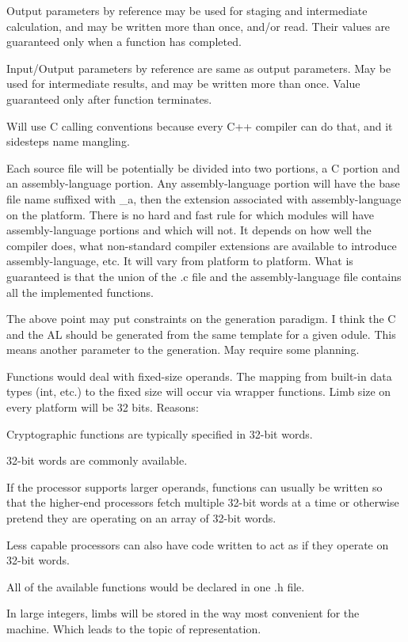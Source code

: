 Output parameters by reference may be used for staging and intermediate
calculation, and may be written more than once, and/or read. Their values
are guaranteed only when a function has completed.

Input/Output parameters by reference are same as output parameters. May be
used for intermediate results, and may be written more than once. Value
guaranteed only after function terminates.

Will use C calling conventions because every C++ compiler can do that,
and it sidesteps name mangling.

Each source file will be potentially be divided into two portions, a C
portion and an assembly-language portion. Any assembly-language portion
will have the base file name suffixed with \_a, then the extension
associated with assembly-language on the platform. There is no hard and
fast rule for which modules will have assembly-language portions and
which will not. It depends on how well the compiler does, what non-standard
compiler extensions are available to introduce assembly-language, etc. It
will vary from platform to platform. What is guaranteed is that the union
of the .c file and the assembly-language file contains all the implemented
functions.

The above point may put constraints on the generation paradigm. I think
the C and the AL should be generated from the same template for a given 
odule. This means another parameter to the generation. May require some
planning.

Functions would deal with fixed-size operands. The mapping from built-in
data types (int, etc.) to the fixed size will occur via wrapper functions.
Limb size on every platform will be 32 bits. Reasons:

Cryptographic functions are typically specified in 32-bit words.

32-bit words are commonly available.

If the processor supports larger operands, functions can usually be written
so that the higher-end processors fetch multiple 32-bit words at a time or
otherwise pretend they are operating on an array of 32-bit words.

Less capable processors can also have code written to act as if they operate
on 32-bit words.

All of the available functions would be declared in one .h file.

In large integers, limbs will be stored in the way most convenient for the
machine. Which leads to the topic of representation.

